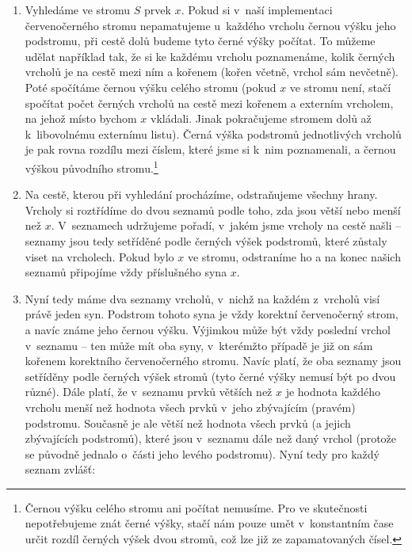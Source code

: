 \begin{enumerate}

\item Vyhledáme ve stromu $S$ prvek $x$. Pokud si v~naší implementaci
červenočerného stromu nepamatujeme u~každého vrcholu černou výšku jeho
podstromu, při cestě dolů budeme tyto černé výšky počítat. To můžeme udělat
například tak, že si ke každému vrcholu poznamenáme, kolik černých vrcholů je
na cestě mezi ním a kořenem (kořen včetně, vrchol sám nevčetně). Poté spočítáme
černou výšku celého stromu (pokud $x$ ve stromu není, stačí spočítat počet
černých vrcholů na cestě mezi kořenem a externím vrcholem, na jehož místo
bychom $x$ vkládali. Jinak pokračujeme stromem dolů až k~libovolnému externímu
listu). Černá výška podstromů jednotlivých vrcholů je pak rovna rozdílu mezi číslem,
které jsme si k~nim poznamenali, a černou výškou původního
stromu.\footnote{Černou výšku celého stromu ani počítat nemusíme.
Pro  ve skutečnosti nepotřebujeme znát černé výšky, stačí nám pouze umět
v~konstantním čase určit rozdíl černých výšek dvou stromů, což lze již ze
zapamatovaných čísel.}

\item Na cestě, kterou při vyhledání procházíme, odstraňujeme všechny hrany.
Vrcholy si roztřídíme do dvou seznamů podle toho, zda jsou větší nebo menší než
$x$. V~seznamech udržujeme pořadí, v~jakém jsme vrcholy na cestě našli --
seznamy jsou tedy setříděné podle černých výšek podstromů, které zůstaly viset na
vrcholech. Pokud bylo $x$ ve stromu, odstraníme ho a na konec našich seznamů
připojíme vždy příslušného syna $x$.

\item Nyní tedy máme dva seznamy vrcholů, v~nichž na každém z~vrcholů visí
právě jeden syn. Podstrom tohoto syna je vždy korektní červenočerný strom, a
navíc známe jeho černou výšku. Výjimkou může být vždy poslední vrchol v~seznamu
-- ten může mít oba syny, v~kterémžto případě je již on sám kořenem korektního
červenočerného stromu. Navíc platí, že oba seznamy jsou setříděny podle černých
výšek stromů (tyto černé výšky nemusí být po dvou různé). Dále platí, že
v~seznamu prvků větších než $x$ je hodnota každého vrcholu menší než hodnota všech
prvků v~jeho zbývajícím (pravém) podstromu. Současně je ale větší než hodnota všech prvků
(a jejich zbývajících podstromů), které jsou v~seznamu dále než daný vrchol (protože se
původně jednalo o~části jeho levého podstromu). Nyní tedy pro každý seznam
zvlášť:
\begin{itemize}


\end{itemize}
\end{enumerate}
